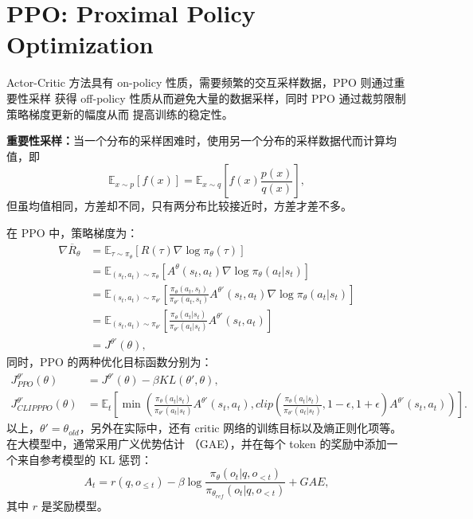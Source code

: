 \section{PPO: Proximal Policy Optimization}
Actor-Critic 方法具有 on-policy 性质，需要频繁的交互采样数据，PPO 则通过重要性采样
获得 off-policy 性质从而避免大量的数据采样，同时 PPO 通过裁剪限制策略梯度更新的幅度从而
提高训练的稳定性。

\textbf{重要性采样：}当一个分布的采样困难时，使用另一个分布的采样数据代而计算均值，即
\begin{equation}
    \mathbb{E}_{x\sim p}[f(x)] = \mathbb{E}_{x \sim q}[f(x)\frac{p(x)}{q(x)}],
\end{equation}
但虽均值相同，方差却不同，只有两分布比较接近时，方差才差不多。

在 PPO 中，策略梯度为：
\begin{align}
    \nabla \overline{R}_{\theta} &= \mathbb{E}_{\tau\sim \pi_{\theta}}[R(\tau)\nabla\log\pi_{\theta}(\tau)]\\
    &= \mathbb{E}_{(s_t,a_t)\sim\pi_{\theta}}[A^{\theta}(s_t,a_t)\nabla\log\pi_{\theta}(a_t|s_t)]\\
    &= \mathbb{E}_{(s_t,a_t)\sim\pi_{\theta'}}[\frac{\pi_{\theta}(a_t,s_t)}{\pi_{\theta'}(a_t,s_t)}
    A^{\theta'}(s_t,a_t)\nabla\log\pi_{\theta}(a_t|s_t)]\\
    &= \mathbb{E}_{(s_t,a_t)\sim \pi_{\theta'}}[\frac{\pi_{\theta}(a_t|s_t)}{\pi_{\theta'}(a_t|s_t)}
    A^{\theta'}(s_t,a_t)]\\
    &= J^{\theta'}(\theta),
\end{align}
同时，PPO 的两种优化目标函数分别为：
\begin{align}
    J^{\theta'}_{PPO}(\theta) &= J^{\theta'}(\theta) - \beta KL(\theta' , \theta),\\
    J^{\theta'}_{CLIP PPO}(\theta) &= \mathbb{E}_t[\min(\frac{\pi_{\theta}(a_t|s_t)}{\pi_{\theta'}(a_t|s_t)}A^{\theta'}(s_t,a_t),
    clip(\frac{\pi_{\theta}(a_t|s_t)}{\pi_{\theta'}(a_t|s_t)},1-\epsilon,1+\epsilon)A^{\theta'}(s_t,a_t))].
\end{align}
以上，$\theta'=\theta_{old}$，另外在实际中，还有 critic 网络的训练目标以及熵正则化项等。
在大模型中，通常采用广义优势估计 （GAE），并在每个 token 的奖励中添加一个来自参考模型的 KL 惩罚：
\begin{equation}
    A_t = r(q,o_{\le t}) - \beta \log \frac{\pi_{\theta}(o_t|q,o_{< t})}{\pi_{\theta_{ref}}(o_t|q,o_{< t})} + GAE,
\end{equation}
其中 $r$ 是奖励模型。

